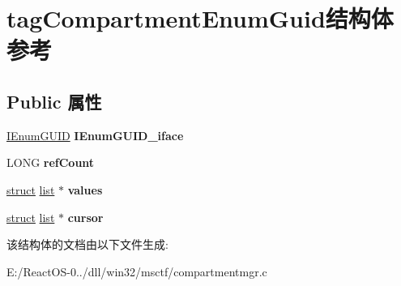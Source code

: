\hypertarget{structtag_compartment_enum_guid}{}\section{tag\+Compartment\+Enum\+Guid结构体 参考}
\label{structtag_compartment_enum_guid}
\subsection*{Public 属性}
\begin{DoxyCompactItemize}
\item 
\mbox{\label{structtag_compartment_enum_guid_a0b1ca36680adf06cff2e0e122beda61a}} 
\hyperlink{interface_i_enum_g_u_i_d}{I\+Enum\+G\+U\+ID} {\bfseries I\+Enum\+G\+U\+I\+D\+\_\+iface}
\item 
\mbox{\label{structtag_compartment_enum_guid_ae79cba2cbc6d93e78a519530cbdc5bcb}} 
L\+O\+NG {\bfseries ref\+Count}
\item 
\mbox{\label{structtag_compartment_enum_guid_a71f8fd56d0e6a2c752cc97943e57210e}} 
\hyperlink{interfacestruct}{struct} \hyperlink{classlist}{list} $\ast$ {\bfseries values}
\item 
\mbox{\label{structtag_compartment_enum_guid_abdb2c0448e029a0cb9f7a3724132921b}} 
\hyperlink{interfacestruct}{struct} \hyperlink{classlist}{list} $\ast$ {\bfseries cursor}
\end{DoxyCompactItemize}


该结构体的文档由以下文件生成\+:\begin{DoxyCompactItemize}
\item 
E\+:/\+React\+O\+S-\/0../dll/win32/msctf/compartmentmgr.\+c\end{DoxyCompactItemize}
